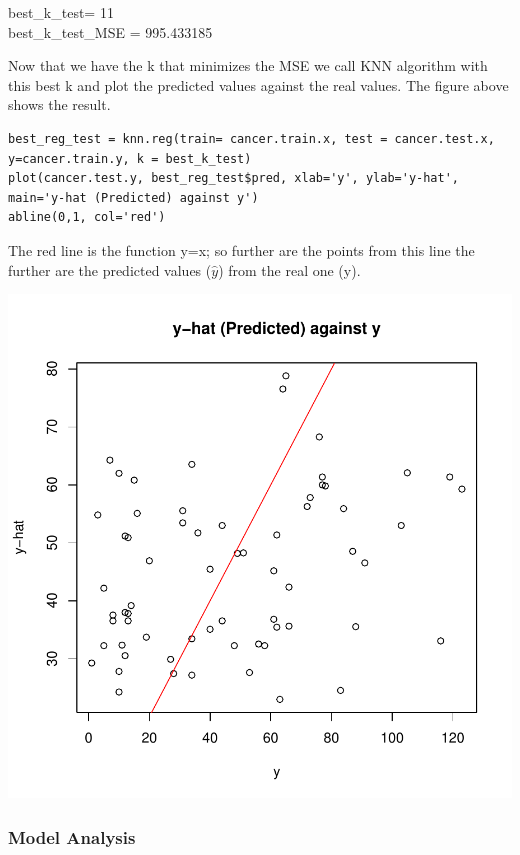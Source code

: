 \documentclass[]{report}
\begin{document}
\begin{center} 
	best\_k\_test= 11 \\
	best\_k\_test\_MSE = 995.433185
\end{center}

Now that we have the k that minimizes the MSE we call KNN algorithm with this best k and plot the predicted values against the real values. The figure above shows the result.

\begin{lstlisting}
best_reg_test = knn.reg(train= cancer.train.x, test = cancer.test.x, y=cancer.train.y, k = best_k_test)
plot(cancer.test.y, best_reg_test$pred, xlab='y', ylab='y-hat', main='y-hat (Predicted) against y')
abline(0,1, col='red')
\end{lstlisting}

The red line is the function y=x; so further are the points from this line the further are the predicted values ($\hat{y}$) from the real one (y).
	
\begin{center}
	\includegraphics{Figures/knn_predicted_test.pdf}
\end{center}

\subsubsection{Model Analysis}
\end{document}
